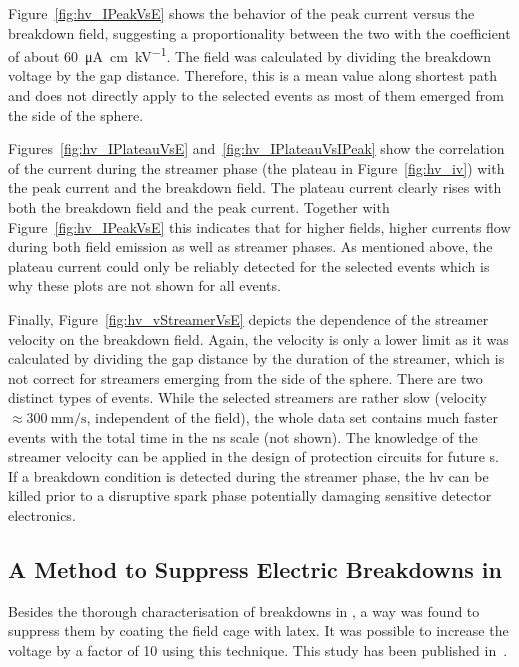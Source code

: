 Figure~\ref{fig:hv_IPeakVsE} shows the behavior of the peak current versus the breakdown field, suggesting a proportionality between the two with the coefficient of about \SI{60}{\micro\ampere\centi\metre\per\kilo\volt}.
The field was calculated by dividing the breakdown voltage by the gap distance.
Therefore, this is a mean value along shortest path and does not directly apply to the selected events as most of them emerged from the side of the sphere.

Figures~\ref{fig:hv_IPlateauVsE} and~\ref{fig:hv_IPlateauVsIPeak} show the correlation of the current during the streamer phase (the plateau in Figure~\ref{fig:hv_iv}) with the peak current and the breakdown field.
The plateau current clearly rises with both the breakdown field and the peak current.
Together with Figure~\ref{fig:hv_IPeakVsE} this indicates that for higher fields, higher currents flow during both field emission as well as streamer phases.
As mentioned above, the plateau current could only be reliably detected for the selected events which is why these plots are not shown for all events.

Finally, Figure~\ref{fig:hv_vStreamerVsE} depicts the dependence of the streamer velocity on the breakdown field.
Again, the velocity is only a lower limit as it was calculated by dividing the gap distance by the duration of the streamer, which is not correct for streamers emerging from the side of the sphere.
There are two distinct types of events.
While the selected streamers are rather slow (velocity $\approx \SI{300}{\milli\metre\per\second}$, independent of the field), the whole data set contains much faster events with the total time in the ns scale (not shown).
The knowledge of the streamer velocity can be applied in the design of protection circuits for future \lartpc{}s.
If a breakdown condition is detected during the streamer phase, the \gls{hv} can be killed prior to a disruptive spark phase potentially damaging sensitive detector electronics.


\subsection{A Method to Suppress Electric Breakdowns in }
\label{sec:studies_hv_latex}

Besides the thorough characterisation of breakdowns in \lar{}, a way was found to suppress them by coating the field cage with latex.
It was possible to increase the voltage by a factor of \num{10} using this technique.
This study has been published in~\cite{latex}.

